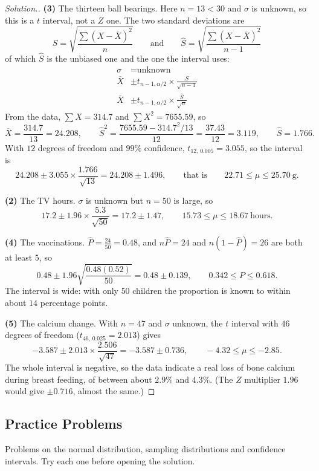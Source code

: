 \documentclass[11pt,a4paper]{article}
\theoremstyle{definition}
\newenvironment{solution}
  {\renewcommand{\qedsymbol}{}\begin{proof}[\textit{Solution}.]}
  {\end{proof}}
\begin{document}
\begin{solution}
\textbf{(3)} The thirteen ball bearings. Here $n=13<30$ and $\sigma$ is unknown, so this
is a $t$ interval, not a $Z$ one. The two standard deviations are
\[S=\sqrt{\frac{\sum (X-\overline{X})^2}{n}}
\qquad \text{and}\qquad 
\hat{S}=\sqrt{\frac{\sum (X-\overline{X})^2}{n-1}}\]
of which $\hat{S}$ is the unbiased one and the one the interval uses:
\begin{align*}
\sigma &=\text{unknown}\\
\overline{X}&\pm t_{n-1,\alpha/2}\times \frac{S}{\sqrt{n-1}}\\[1ex] \overline{X}&\pm t_{n-1,\alpha/2}\times \frac{\hat{S}}{\sqrt{n}}
\end{align*}
From the data, $\sum X = 314.7$ and $\sum X^2 = 7655.59$, so
\[\overline{X} = \frac{314.7}{13} = 24.208,\qquad
\hat S^2 = \frac{7655.59 - 314.7^2/13}{12} = \frac{37.43}{12} = 3.119,\qquad \hat S = 1.766 .\]
With $12$ degrees of freedom and $99\%$ confidence, $t_{12,\,0.005} = 3.055$, so the interval is
\[24.208\pm 3.055\times\frac{1.766}{\sqrt{13}} = 24.208\pm 1.496,\qquad\text{that is}\qquad 22.71\leq\mu\leq 25.70\ \text{g}.\]

\textbf{(2)} The TV hours. $\sigma$ is unknown but $n = 50$ is large, so
\[17.2\pm 1.96\times\frac{5.3}{\sqrt{50}} = 17.2\pm 1.47,\qquad 15.73\leq\mu\leq 18.67\ \text{hours}.\]

\textbf{(4)} The vaccinations. $\hat P = \frac{24}{50} = 0.48$, and $n\hat P = 24$ and $n(1 - \hat P) = 26$
are both at least $5$, so
\[0.48\pm 1.96\sqrt{\frac{0.48(0.52)}{50}} = 0.48\pm 0.139,\qquad 0.342\leq P\leq 0.618 .\]
The interval is wide: with only $50$ children the proportion is known to within about $14$
percentage points.

\textbf{(5)} The calcium change. With $n = 47$ and $\sigma$ unknown, the $t$ interval with
$46$ degrees of freedom ($t_{46,\,0.025} = 2.013$) gives
\[-3.587\pm 2.013\times\frac{2.506}{\sqrt{47}} = -3.587\pm 0.736,\qquad -4.32\leq\mu\leq -2.85 .\]
The whole interval is negative, so the data indicate a real loss of bone calcium during
breast feeding, of between about $2.9\%$ and $4.3\%$. (The $Z$ multiplier $1.96$ would give
$\pm 0.716$, almost the same.)
\end{solution}

\pagebreak
\subsection{Practice Problems}

Problems on the normal distribution, sampling distributions and confidence
intervals. Try each one before opening the solution.
\end{document}
